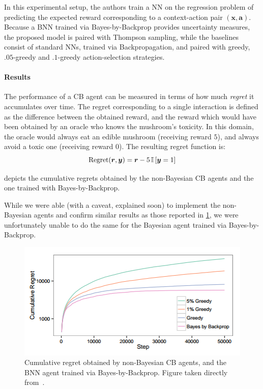 \documentclass[11pt]{article}
\begin{document}
In this experimental setup, the authors train a NN on the regression problem of
predicting the expected reward corresponding to a context-action pair $(\bm x,
\bm a)$.  
Because a BNN trained via Bayes-by-Backprop provides
uncertainty measures, the proposed model is paired with Thompson sampling,
while the baselines consist of standard NNs, trained via Backpropagation, and
paired with greedy, $.05$-greedy and $.1$-greedy action-selection strategies.


\paragraph{Results} 

The performance of a CB agent can be measured in terms of how much
\emph{regret} it accumulates over time.  The regret corresponding to a single
interaction is defined as the difference between the obtained reward, and the
reward which would have been obtained by an oracle who knows the mushroom's
toxicity.  In this domain, the oracle would always eat an edible mushroom
(receiving reward $5$), and always avoid a toxic one (receiving reward $0$).
The resulting regret function is:
%
\begin{equation}
  \operatorname{Regret}(\bm r, \bm y) = \bm r - 5 \, {\mathbb{I}}\left[ \bm
  y = 1 \right]
\end{equation}

 depicts the cumulative regrets obtained by the
non-Bayesian CB agents and the one trained with Bayes-by-Backprop.  

While we were able (with a caveat, explained soon) to implement the
non-Bayesian agents and confirm similar results as those reported in
\cref{fig:cb_cumregret}, we were unfortunately unable to do the same for the
Bayesian agent trained via Bayes-by-Backprop.



\begin{figure}
  \centering
  \includegraphics[width=.5\textwidth]{figures/cb_cumregret.png}
  \caption{Cumulative regret obtained by non-Bayesian CB agents, and the BNN
  agent trained via Bayes-by-Backprop.  Figure taken directly
  from~\cite{blundell}.}\label{fig:cb_cumregret}
\end{figure}
\end{document}
